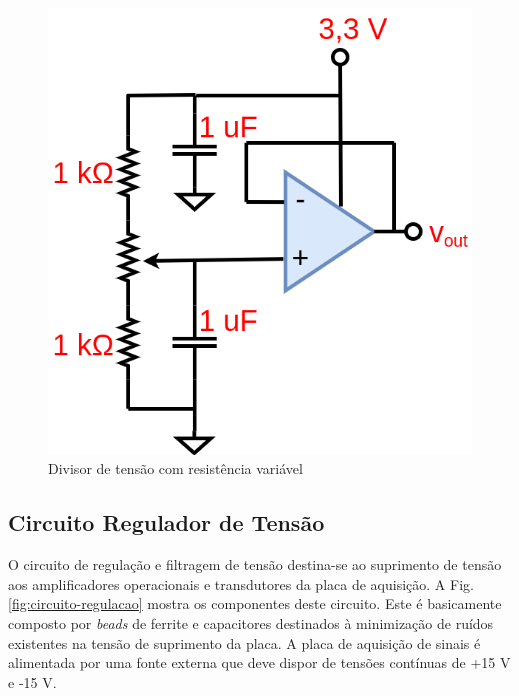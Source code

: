 \begin{figure}[!hbt]
	\begin{center}
		\includegraphics[scale=0.25]{figuras/divisor-tensao.png}
		\caption{Divisor de tensão com resistência variável}
		\label{fig:divisor-tensao}
	\end{center}
\end{figure}

\subsection{Circuito Regulador de Tensão}

O circuito de regulação e filtragem de tensão destina-se ao suprimento de tensão aos amplificadores operacionais e transdutores da placa de aquisição. A Fig. \ref{fig:circuito-regulacao} mostra os componentes deste circuito. Este é basicamente composto por \textit{beads} de ferrite e capacitores destinados à minimização de ruídos existentes na tensão de suprimento da placa. A placa de aquisição de sinais é alimentada por uma fonte externa que deve dispor de tensões contínuas de +15 V e -15 V.

